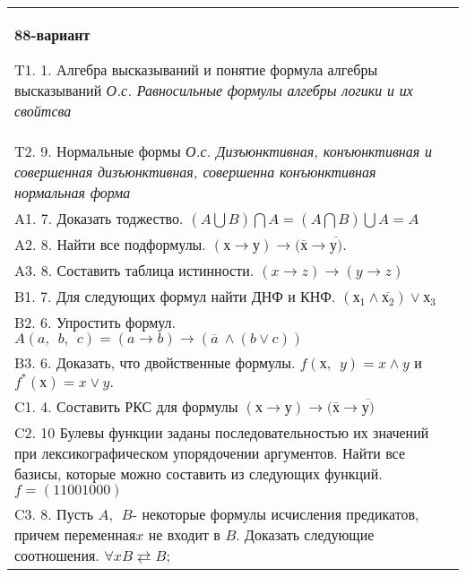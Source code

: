\documentclass{article}
\begin{document}
\begin{tabular}{m{17cm}}
\textbf{88-вариант}
\newline

T1. 1. Алгебра высказываний и понятие формула алгебры высказываний \emph{О.с. Равносильные формулы алгебры логики и их свойтсва} \\
T2. 9. Нормальные формы \emph{О.с. Дизъюнктивная, конъюнктивная и совершенная дизъюнктивная, совершенна конъюнктивная нормальная форма} \\
A1. 7. Доказать тоджество. \((A\bigcup B)\bigcap A = (A\bigcap B)\bigcup A = A\) \\
A2. 8. Найти все подформулы. \((х \rightarrow у) \rightarrow (\overline{х} \rightarrow \overline{у)}\). \\
A3. 8. Составить таблица истинности. \((x \rightarrow z) \rightarrow (y \rightarrow z)\) \\
B1. 7. Для следующих формул найти ДНФ и КНФ. \(\left( х_{1} \land \overline{х_{2}} \right) \vee х_{3}\) \\
B2. 6. Упростить формул. \(A(a,\ \ b,\ \ c) = (a \rightarrow b) \rightarrow (\overline{a}\  \land (b \vee c))\) \\
B3. 6. Доказать, что двойственные формулы. \(f(х,\ \ y) = x \land y\) и \(f^{*}(х) = x \vee y.\) \\
C1. 4. Составить РКС для формулы \((х \rightarrow у) \rightarrow (\overline{х} \rightarrow \overline{у)}\) \\
C2. 10 Булевы функции заданы последовательностью их значений при лексикографическом упорядочении аргументов. Найти все базисы, которые можно составить из следующих функций. \(f = (11001000)\) \\
C3. 8. Пусть \(A,\ \ B\)- некоторые формулы исчисления предикатов, причем переменная\(x\) не входит в \(B\). Доказать следующие соотношения. \(\forall xB \rightleftarrows B\); \\

\end{tabular}
\vspace{1cm}
\end{document}
